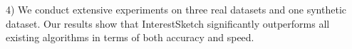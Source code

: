 	4) We conduct extensive experiments on three real datasets and one synthetic dataset. Our results show that InterestSketch significantly outperforms all existing algorithms in terms of both accuracy and speed.








